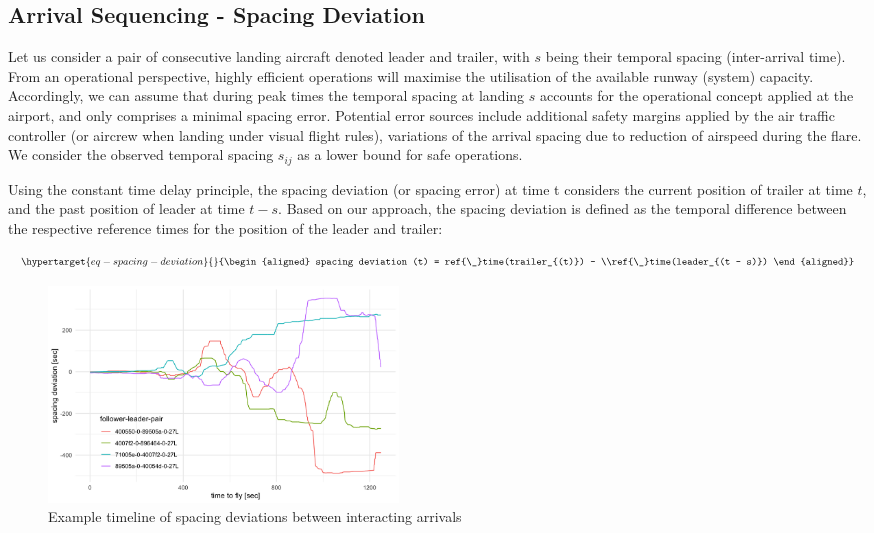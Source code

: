 \documentclass[letterpaper, 10 pt, journal, twoside]{IEEEtran}
\begin{document}
\hypertarget{arrival-sequencing---spacing-deviation}{%
\subsection{Arrival Sequencing - Spacing
Deviation}\label{arrival-sequencing---spacing-deviation}}

Let us consider a pair of consecutive landing aircraft denoted leader
and trailer, with \(s\) being their temporal spacing (inter-arrival
time). From an operational perspective, highly efficient operations will
maximise the utilisation of the available runway (system) capacity.
Accordingly, we can assume that during peak times the temporal spacing
at landing \(s\) accounts for the operational concept applied at the
airport, and only comprises a minimal spacing error. Potential error
sources include additional safety margins applied by the air traffic
controller (or aircrew when landing under visual flight rules),
variations of the arrival spacing due to reduction of airspeed during
the flare. We consider the observed temporal spacing \(s_{ij}\) as a
lower bound for safe operations.

Using the constant time delay principle, the spacing deviation (or
spacing error) at time t considers the current position of trailer at
time \(t\), and the past position of leader at time \(t-s\). Based on
our approach, the spacing deviation is defined as the temporal
difference between the respective reference times for the position of
the leader and trailer:

\begin{equation}\protect\hypertarget{eq-spacing-deviation}{}{\begin{aligned}
spacing deviation (t) =  ref{\_}time(trailer_{(t)}) - \\ref{\_}time(leader_{(t - s)})
\end{aligned}}\label{eq-spacing-deviation}\end{equation}

\begin{figure}

{\centering \includegraphics[width=0.45\textwidth,height=\textheight]{./figures/example-follower-leader-pairs.png}

}

\caption{\label{fig-follower-leader-example}Example timeline of spacing
deviations between interacting arrivals}

\end{figure}
\end{document}
